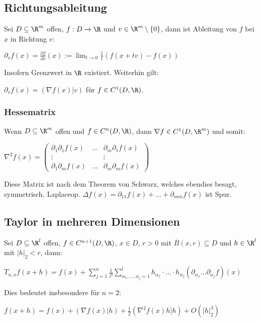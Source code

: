 \subsection*{Richtungsableitung}

Sei $D \subseteq \R^m$ offen, $f : D \rightarrow \R$ und $v \in \R^m \setminus \{0\}$, dann ist Ableitung von $f$ bei $x$ in Richtung $v$:

$\partial_v f(x) = \frac{\partial f}{\partial v}(x) := \displaystyle\lim_{t \to 0} \frac{1}{t} (f(x+tv)-f(x))$

Insofern Grenzwert in $\R$ existiert. Weiterhin gilt:

$\partial_v f(x) = (\nabla f(x) | v)$ für $f \in C^1(D, \R)$.

\subsubsection*{Hessematrix}

Wenn $D \subseteq \R^m$ offen und $f \in C^n(D, \R)$, dann $\nabla f \in C^1(D,\R^m)$ und somit:

$\nabla^2 f(x) = \begin{pmatrix} \partial_1 \partial_1 f(x) & \hdots & \partial_m \partial_1 f(x) \\ \vdots & & \vdots \\ \partial_1 \partial_m f(x) & \hdots & \partial_m \partial_m f(x) \end{pmatrix}$

	Diese Matrix ist nach dem Theorem von Schwarz, welches ebendies besagt, symmetrisch. Laplaceop. $\Delta f(x) = \partial_{11}f(x) + ... + \partial_{mm} f(x)$ ist Spur.

\subsection*{Taylor in mehreren Dimensionen}

Sei $D \subseteq \R^l$ offen, $f \in C^{n+1}(D, \R)$, $x \in D$, $r > 0$ mit $\overline B(x,r) \subseteq D$ und $h \in \R^l$ mit $|h|_2 < r$, dann:

$T_{n,x} f(x+h) = f(x) + \displaystyle\sum_{j=1}^n \frac{1}{j!} \displaystyle\sum_{\alpha_1, ..., \alpha_j=1}^l h_{\alpha_1} \cdot \hdots \cdot h_{\alpha_j} ( \partial_{\alpha_1} \hdots \partial_{\alpha_j} f )(x)$

Dies bedeutet insbesondere für $n=2$:

$f(x+h) = f(x) + (\nabla f(x)|h) + \frac{1}{2}(\nabla^2 f(x)h|h) + O(|h|_2^3)$

